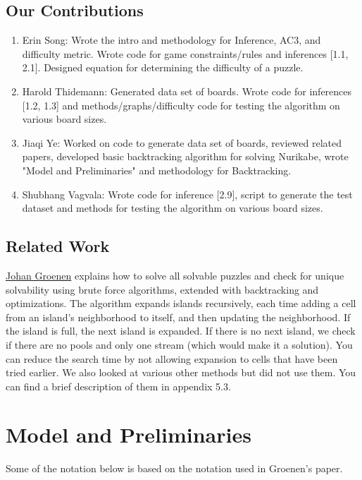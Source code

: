 \documentclass{article}
\theoremstyle{definition}
\begin{document}
\subsection{Our Contributions}\label{sec:contrib}

\begin{enumerate}
    \item Erin Song: Wrote the intro and methodology for Inference, AC3, and difficulty metric. Wrote code for game constraints/rules and inferences [1.1, 2.1]. Designed equation for determining the difficulty of a puzzle.
    \item Harold Thidemann: Generated data set of boards. Wrote code for inferences [1.2, 1.3] and methods/graphs/difficulty code for testing the algorithm on various board sizes.
    \item Jiaqi Ye: Worked on code to generate data set of boards, reviewed related papers, developed basic backtracking algorithm for solving Nurikabe, wrote "Model and Preliminaries" and methodology for Backtracking.
    \item Shubhang Vagvala: Wrote code for inference [2.9], script to generate the test dataset and methods for testing the algorithm on various board sizes.
\end{enumerate}

\subsection{Related Work}\label{sec:related}

\hyperlink{https://theses.liacs.nl/pdf/18-JohanGroenen.pdf}{Johan Groenen} \cite{Groenen} explains how to solve all solvable puzzles and check for unique solvability using brute force algorithms, extended with backtracking and optimizations. The algorithm expands islands recursively, each time adding a cell from an island’s neighborhood to itself, and then updating the neighborhood. If the island is full, the next island is expanded. If there is no next island, we check if there are no pools and only one stream (which would make it a solution). You can reduce the search time by not allowing expansion to cells that have been tried earlier. We also looked at various other methods but did not use them. You can find a brief description of them in appendix 5.3.

\section{Model and Preliminaries}
Some of the notation below is based on the notation used in Groenen's \cite{Groenen} paper.
\end{document}
